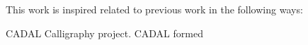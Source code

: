 This work is inspired related to previous work in the following ways:

CADAL Calligraphy project.  CADAL formed
